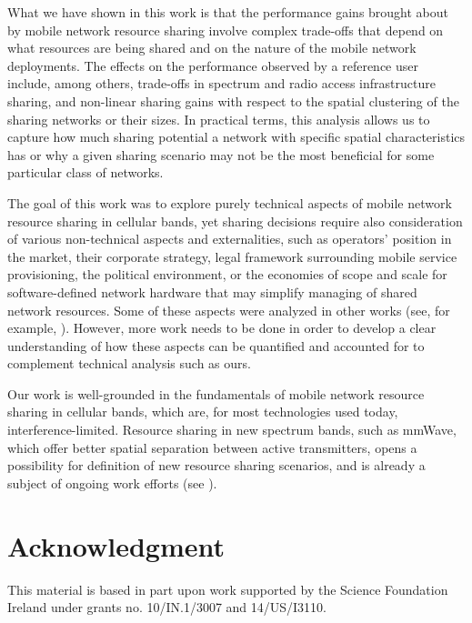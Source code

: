 \documentclass[12pt, journal,doublecolumn, final]{IEEEtran}
\begin{document}
What we have shown in this work is that the performance gains brought about by mobile network resource sharing involve complex trade-offs that depend on what resources are being shared and on the nature of the mobile network deployments. The effects on the performance observed by a reference user include, among others, trade-offs in spectrum and radio access infrastructure sharing, and non-linear sharing gains with respect to the spatial clustering of the sharing networks or their sizes. In practical terms, this analysis allows us to capture how much sharing potential a network with specific spatial characteristics has or why a given sharing scenario may not be the most beneficial for some particular class of networks.

The goal of this work was to explore purely technical aspects of mobile network resource sharing in cellular bands, yet sharing decisions require also consideration of various non-technical aspects and externalities, such as operators' position in the market, their corporate strategy, legal framework surrounding mobile service provisioning, the political environment, or the economies of scope and scale for software-defined network hardware that may simplify managing of shared network resources. Some of these aspects were analyzed in other works (see, for example, \cite{Markendahl_2011,AhmedYangSungMarkendahl_2015}). However, more work needs to be done in order to develop a clear understanding of how these aspects can be quantified and accounted for to complement technical analysis such as ours.

Our work is well-grounded in the fundamentals of mobile network resource sharing in cellular bands, which are, for most technologies used today, interference-limited. Resource sharing in new spectrum bands, such as \ac{mmWave}, which offer better spatial separation between active transmitters, opens a possibility for definition of new resource sharing scenarios, and is already a subject of ongoing work efforts (see \cite{GuptaAndrewsHeath_2015,RebatoMezzavillaRanganZorzi_2016,GuptaAlkhateebAndrewsHeath_2016}).



\section*{Acknowledgment}

This material is based in part upon work supported by the Science Foundation Ireland under grants no. 10/IN.1/3007 and 14/US/I3110.
\end{document}

